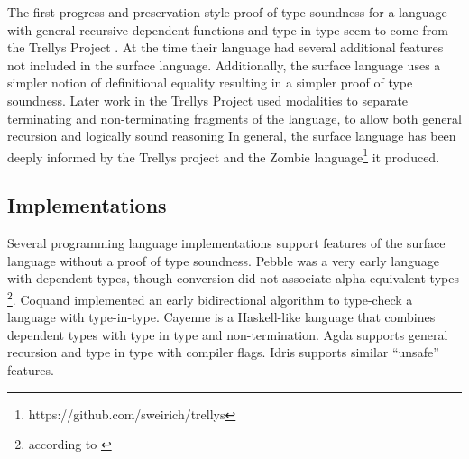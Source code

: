 The first progress and preservation style proof of type soundness for a language with general recursive dependent functions and type-in-type seem to come from the Trellys Project \cite{sjoberg2012irrelevance}.
At the time their language had several additional features not included in the surface language.
Additionally, the surface language uses a simpler notion of definitional equality resulting in a simpler proof of type soundness.
Later work in the Trellys Project\cite{casinghino2014combining,casinghino2014combiningthesis} used modalities to separate terminating and non-terminating fragments of the language, to allow both general recursion and logically sound reasoning%
In general, the surface language has been deeply informed by the Trellys project\cite{sjoberg2012irrelevance}\cite{casinghino2014combining,casinghino2014combiningthesis} \cite{sjoberg2015programming} \cite{sjoberg2015dependently} and the Zombie language\footnote{https://github.com/sweirich/trellys} it produced.



\subsection{Implementations}

Several programming language implementations support features of the surface language without a proof of type soundness.
Pebble\cite{10.1007/3-540-13346-1_1} was a very early language with dependent types, though conversion did not associate alpha equivalent types \footnote{according to \cite{Reinhold89typecheckingis}}.
Coquand implemented an early bidirectional algorithm to type-check a language with type-in-type\cite{COQUAND1996167}.
Cayenne \cite{10.1145/289423.289451} is a Haskell-like language that combines dependent types with type in type and non-termination.
Agda supports general recursion and type in type with compiler flags.
Idris supports similar ``unsafe'' features.


